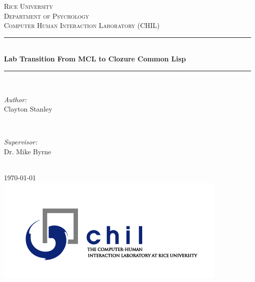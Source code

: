 \documentclass[12pt]{article} %
\begin{document}

\begin{titlepage}

\newcommand{\HRule}{\rule{\linewidth}{0.5mm}} %

\center %

\textsc{\LARGE Rice University}\\[1.5cm] %
\textsc{\Large Department of Psychology}\\[0.5cm] %
\textsc{\large Computer Human Interaction Laboratory (CHIL)}\\[0.5cm] %


\HRule \\[0.4cm]
{ \huge \bfseries Lab Transition From MCL to Clozure Common Lisp}\\[0.4cm] %
\HRule \\[1.5cm]

\begin{minipage}{0.4\textwidth}
\begin{flushleft} \large
\emph{Author:}\\
Clayton Stanley %
\end{flushleft}
\end{minipage}
~
\begin{minipage}{0.4\textwidth}
\begin{flushright} \large
\emph{Supervisor:} \\
Dr. Mike Byrne %
\end{flushright}
\end{minipage}\\[4cm]

{\large \today}\\[1cm] %

\includegraphics[scale=.5]{ChilLogo} %

\vfill %

\end{titlepage}
\end{document}
